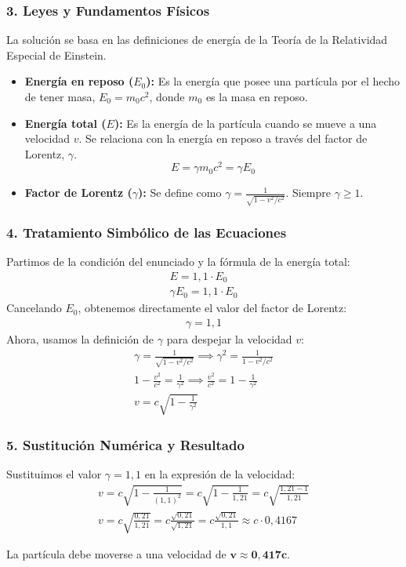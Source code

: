 \subsubsection*{3. Leyes y Fundamentos Físicos}
La solución se basa en las definiciones de energía de la Teoría de la Relatividad Especial de Einstein.
\begin{itemize}
    \item \textbf{Energía en reposo ($E_0$):} Es la energía que posee una partícula por el hecho de tener masa, $E_0 = m_0c^2$, donde $m_0$ es la masa en reposo.
    \item \textbf{Energía total ($E$):} Es la energía de la partícula cuando se mueve a una velocidad $v$. Se relaciona con la energía en reposo a través del factor de Lorentz, $\gamma$.
    $$ E = \gamma m_0c^2 = \gamma E_0 $$
    \item \textbf{Factor de Lorentz ($\gamma$):} Se define como $\gamma = \frac{1}{\sqrt{1 - v^2/c^2}}$. Siempre $\gamma \ge 1$.
\end{itemize}

\subsubsection*{4. Tratamiento Simbólico de las Ecuaciones}
Partimos de la condición del enunciado y la fórmula de la energía total:
\begin{gather}
    E = 1,1 \cdot E_0 \\
    \gamma E_0 = 1,1 \cdot E_0
\end{gather}
Cancelando $E_0$, obtenemos directamente el valor del factor de Lorentz:
\begin{gather}
    \gamma = 1,1
\end{gather}
Ahora, usamos la definición de $\gamma$ para despejar la velocidad $v$:
\begin{gather}
    \gamma = \frac{1}{\sqrt{1 - v^2/c^2}} \implies \gamma^2 = \frac{1}{1 - v^2/c^2} \nonumber \\
    1 - \frac{v^2}{c^2} = \frac{1}{\gamma^2} \implies \frac{v^2}{c^2} = 1 - \frac{1}{\gamma^2} \nonumber \\
    v = c \sqrt{1 - \frac{1}{\gamma^2}}
\end{gather}

\subsubsection*{5. Sustitución Numérica y Resultado}
Sustituimos el valor $\gamma = 1,1$ en la expresión de la velocidad:
\begin{gather}
    v = c \sqrt{1 - \frac{1}{(1,1)^2}} = c \sqrt{1 - \frac{1}{1,21}} = c \sqrt{\frac{1,21 - 1}{1,21}} \nonumber \\
    v = c \sqrt{\frac{0,21}{1,21}} = c \frac{\sqrt{0,21}}{\sqrt{1,21}} = c \frac{\sqrt{0,21}}{1,1} \approx c \cdot 0,4167
\end{gather}
\begin{cajaresultado}
    La partícula debe moverse a una velocidad de $\boldsymbol{v \approx 0,417 c}$.
\end{cajaresultado}

